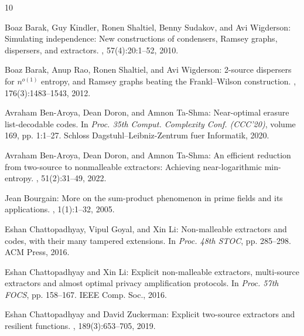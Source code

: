 \documentclass[11pt]{article}
\numberwithin{equation}{section}
\theoremstyle{definition}
\theoremstyle{plain}
\begin{document}
\tocrefpdfbookmark
\begin{thebibliography}{10}

{\sc Boaz Barak, Guy Kindler, Ronen Shaltiel, Benny Sudakov, and Avi
  Wigderson}: Simulating independence: {N}ew constructions of condensers,
  {R}amsey graphs, dispersers, and extractors.
, 57(4):20:1--52, 2010.
\newblock [\epfmtdoi{10.1145/1734213.1734214}]

{\sc Boaz Barak, Anup Rao, Ronen Shaltiel, and Avi Wigderson}: 2-source
  dispersers for {$n^{o(1)}$} entropy, and {R}amsey graphs beating the
  {F}rankl--{W}ilson construction.
, 176(3):1483--1543, 2012.

{\sc Avraham Ben-Aroya, Dean Doron, and Amnon Ta-Shma}: Near-optimal erasure
  list-decodable codes.
\newblock In {\em Proc. 35th Comput. Complexity Conf. (CCC'20)}, volume 169,
  pp. 1:1--27. Schloss Dagstuhl--Leibniz-Zentrum fuer Informatik, 2020.

{\sc Avraham Ben-Aroya, Dean Doron, and Amnon Ta-Shma}: An efficient reduction
  from two-source to nonmalleable extractors: Achieving near-logarithmic
  min-entropy.
, 51(2):31--49, 2022.
\newblock [\epfmtdoi{10.1137/17M1133245}]

{\sc Jean Bourgain}: More on the sum-product phenomenon in prime fields and its
  applications.
, 1(1):1--32, 2005.
\newblock [\epfmtdoi{10.1142/S1793042105000108}]

{\sc Eshan Chattopadhyay, Vipul Goyal, and Xin Li}: Non-malleable extractors
  and codes, with their many tampered extensions.
\newblock In {\em Proc. 48th STOC}, pp. 285--298. ACM Press, 2016.
\newblock [\epfmtdoi{10.1145/2897518.2897547}]

{\sc Eshan Chattopadhyay and Xin Li}: Explicit non-malleable extractors,
  multi-source extractors and almost optimal privacy amplification protocols.
\newblock In {\em Proc. 57th FOCS}, pp. 158--167. IEEE Comp. Soc., 2016.

{\sc Eshan Chattopadhyay and David Zuckerman}: Explicit two-source extractors
  and resilient functions.
, 189(3):653--705, 2019.


\end{thebibliography}
\end{document}
